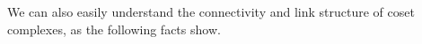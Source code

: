 \documentclass[11pt]{article}
\newcommand{\CC}[2]{\mathcal{C}\mathcal{C}(#1;#2)}
\begin{document}
We can also easily understand the connectivity and link structure of coset complexes, as the following facts show.
%
\end{document}
